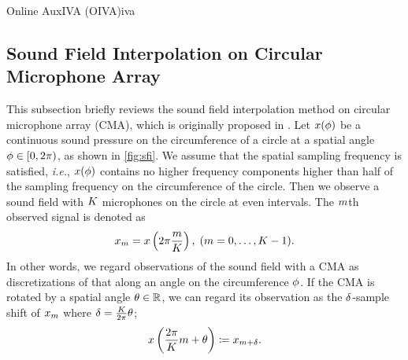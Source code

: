 \documentclass[sip,biber]{now-journal}
\begin{document}
\begin{algorithm}{Online AuxIVA (OIVA)}{iva}
\end{algorithm}

\subsection{Sound Field Interpolation on Circular Microphone Array}
This subsection briefly reviews the sound field interpolation method on circular microphone array (CMA), which is originally proposed in \cite{Wakabayashi:2021:ICASSP,Wakabayashi:2023:ASLP}.
Let $x (\phi)$ be a continuous sound pressure on the circumference of a circle at a spatial angle $\rotCoor \in \interval[open right,soft open fences]{0}{2\pi}$, as shown in \cref{fig:sfi}.
We assume that the spatial sampling frequency is satisfied, \emph{i.e.}, $x (\phi)$ contains no higher frequency components higher than half of the sampling frequency on the circumference of the circle.
Then we observe a sound field with $K$ microphones on the circle at even intervals.
The $m$th observed signal is denoted as
\begin{equation}
  \sfcma _{\mic} = \sfcma \left(2\pi \frac{\mic}{\Mic}\right),\; (\mic = 0, \dots, \Mic - 1).%
  \label{eq:sfi:model}
\end{equation}
In other words, we regard observations of the sound field with a CMA as discretizations of that along an angle on the circumference $\phi$.
If the CMA is rotated by a spatial angle $\theta \in \mathbb{R}$, we can regard its observation as the $\delta$-sample shift of $x _{m}$ where $\delta = \frac{K}{2\pi} \theta$;
\begin{equation}
  \sfcma \left(\frac{2\pi}{\Mic} \mic + \rotSpat \right)%
  \coloneqq
  \sfcma _{\mic + \rotSmpl}.
  \label{eq:sfi:shift:obs}
\end{equation}
\end{document}
